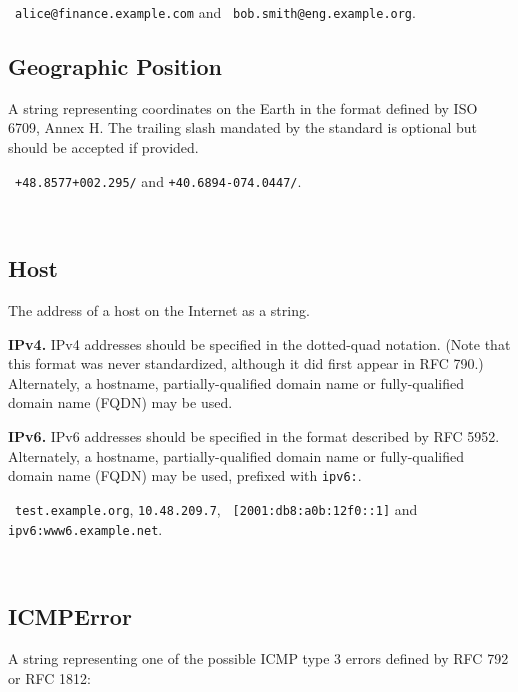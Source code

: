 \documentclass[10pt]{article}
\begin{document}
\example\ {\tt alice@finance.example.com} and {\tt
  bob.smith@eng.example.org}.



\subsection{Geographic Position}
A string representing coordinates on the Earth in the format defined
by ISO 6709, Annex H.  The trailing slash mandated by the standard is
optional but should be accepted if provided.

\example\ {\tt +48.8577+002.295/} and {\tt +40.6894-074.0447/}.

\\





\subsection{Host}
The address of a host on the Internet as a string.

{\bf IPv4.}  IPv4 addresses should be specified in the dotted-quad
notation.  (Note that this format was never standardized, although it
did first appear in RFC 790.)  Alternately, a hostname,
partially-qualified domain name or fully-qualified domain name (FQDN)
may be used.

{\bf IPv6.}  IPv6 addresses should be specified in the format
described by RFC 5952.  Alternately, a hostname, partially-qualified
domain name or fully-qualified domain name (FQDN) may be used,
prefixed with {\tt ipv6:}.  

\example\ {\tt test.example.org}, {\tt 10.48.209.7}, {\tt
  [2001:db8:a0b:12f0::1]} and {\tt ipv6:www6.example.net}.

\\


\subsection{ICMPError}
A string representing one of the possible ICMP type 3 errors defined by RFC 792 or RFC 1812:
\end{document}
